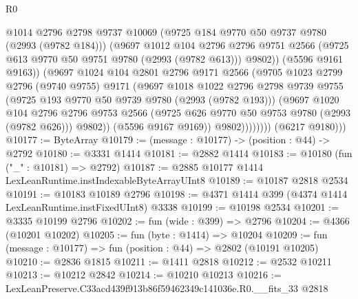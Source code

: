 \begin{lexlean}{R0}
\begin{coremodule}
                          @1014
                          @2796
                          @2798
                          @9737
                          @10069
                          (@9725 @184 @9770 @50 @9737 @9780 (@2993 (@9782 @184)))
                          (@9697
                            @1012
                            @104
                            @2796
                            @2796
                            @9751
                            @2566
                            (@9725 @613 @9770 @50 @9751 @9780 (@2993 (@9782 @613)))
                            @9802))
                        (@5596 @9161 @9163))
                      (@9697
                        @1024
                        @104
                        @2801
                        @2796
                        @9171
                        @2566
                        (@9705
                          @1023
                          @2799
                          @2796
                          (@9740 @9755)
                          @9171
                          (@9697
                            @1018
                            @1022
                            @2796
                            @2798
                            @9739
                            @9755
                            (@9725 @193 @9770 @50 @9739 @9780 (@2993 (@9782 @193)))
                            (@9697
                              @1020
                              @104
                              @2796
                              @2796
                              @9753
                              @2566
                              (@9725 @626 @9770 @50 @9753 @9780 (@2993 (@9782 @626)))
                              @9802))
                          (@5596 @9167 @9169))
                        @9802))))))))
        (@6217 @9180)))
@10177 := ByteArray
@10179 := (message : @10177) -> (position : @44) -> @2792
@10180 := @3331 @1414
@10181 := @2882 @1414
@10183 := @10180 (fun ("_" : @10181) => @2792)
@10187 := @2885 @10177 @1414 LexLeanRuntime.instIndexableByteArrayUInt8
@10189 := @10187 @2818 @2534
@10191 := @10183 @10189 @2796
@10198 := @4371 @1414 @399 (@4374 @1414 LexLeanRuntime.instFixedUInt8) @3338
@10199 := @10198 @2534
@10201 := @3335 @10199 @2796
@10202 := fun (wide : @399) => @2796
@10204 := @4366 (@10201 @10202)
@10205 := fun (byte : @1414) => @10204
@10209 := fun (message : @10177) => fun (position : @44) => @2802 (@10191 @10205)
@10210 := @2836 @1815
@10211 := @1411 @2818
@10212 := @2532 @10211
@10213 := @10212 @2842
@10214 := @10210 @10213
@10216 := LexLeanPreserve.C33acd439f913b86f59462349c141036e.R0.__fits_33 @2818

\end{coremodule}
\end{lexlean}
